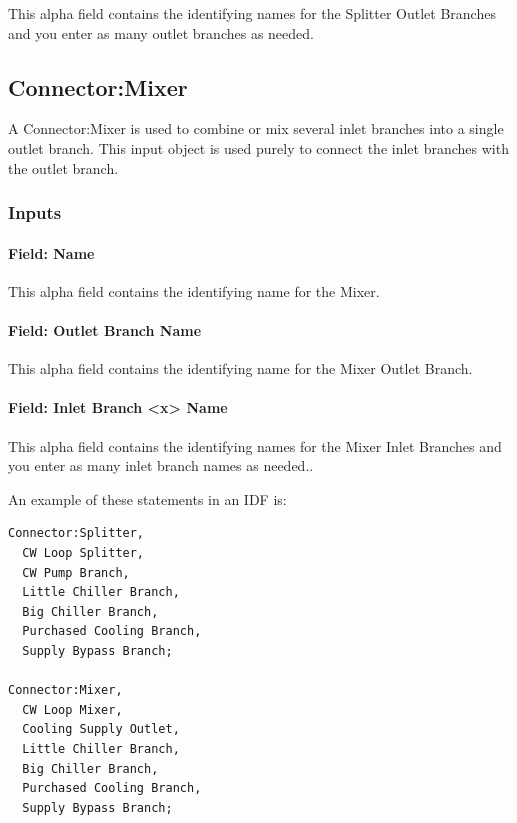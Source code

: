 This alpha field contains the identifying names for the Splitter Outlet Branches and you enter as many outlet branches as needed.

\subsection{Connector:Mixer}\label{connectormixer}

A Connector:Mixer is used to combine or mix several inlet branches into a single outlet branch.  This input object is used purely to connect the inlet branches with the outlet branch.

\subsubsection{Inputs}\label{inputs-1-031}

\paragraph{Field: Name}\label{field-name-1-030}

This alpha field contains the identifying name for the Mixer.

\paragraph{Field: Outlet Branch Name}\label{field-outlet-branch-name}

This alpha field contains the identifying name for the Mixer Outlet Branch.

\paragraph{Field: Inlet Branch \textless{}x\textgreater{} Name}\label{field-inlet-branch-x-name}

This alpha field contains the identifying names for the Mixer Inlet Branches and you enter as many inlet branch names as needed..

An example of these statements in an IDF is:

\begin{lstlisting}
Connector:Splitter,
  CW Loop Splitter,
  CW Pump Branch,
  Little Chiller Branch,
  Big Chiller Branch,
  Purchased Cooling Branch,
  Supply Bypass Branch;

Connector:Mixer,
  CW Loop Mixer,
  Cooling Supply Outlet,
  Little Chiller Branch,
  Big Chiller Branch,
  Purchased Cooling Branch,
  Supply Bypass Branch;
\end{lstlisting}

